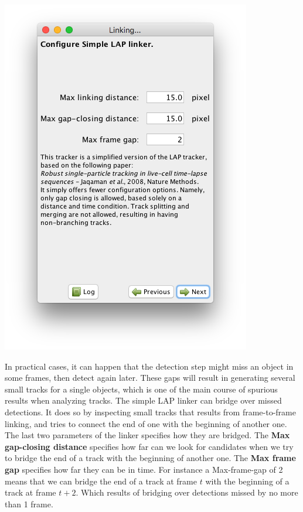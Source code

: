 \begin{center}
    \includegraphics[height=0.25\textheight,trim=0.5cm .5cm .5cm .5cm,clip]{figures/Mastodon_LinkingWizard_03.png}
\end{center}

In practical cases, it can happen that the detection step might miss an object in some frames, then detect again later.
These gaps will result in generating several small tracks for a single objects, which is one of the main course of spurious results when analyzing tracks. 
The simple LAP linker can bridge over missed detections.
It does so by inspecting small tracks that results from frame-to-frame linking, and tries to connect the end of one with the beginning of another one.
The last two parameters of the linker specifies how they are bridged. 
The \textbf{Max gap-closing distance} specifies how far can we look for candidates when we try to bridge the end of a track with the beginning of another one.
The \textbf{Max frame gap} specifies how far they can be in time. 
For instance a Max-frame-gap of 2 means that we can bridge the end of a track at frame $t$ with the beginning of a track at frame $t+2$.
Which results of bridging over detections missed by no more than 1 frame.

